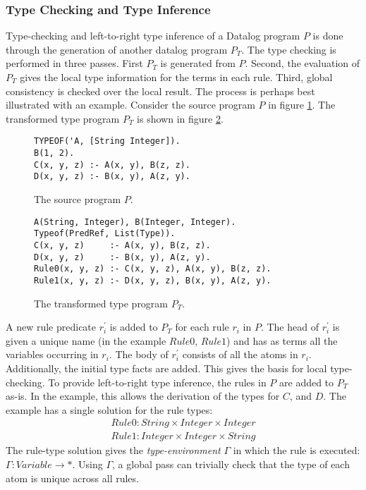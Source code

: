 \subsubsection{Type Checking and Type Inference}
Type-checking and left-to-right type inference of a Datalog program $P$ is done through the generation of another datalog program $P_T$. The type checking is performed in three passes. First $P_T$ is generated from $P$. Second, the evaluation of $P_T$ gives the local type information for the terms in each rule. Third, global consistency is checked over the local result. The process is perhaps best illustrated with an example. Consider the source program $P$ in figure \ref{figure:sourceP}. The transformed type program $P_T$ is shown in figure \ref{figure:sourcePT}.
\begin{figure}[!ht]
\begin{verbatim}
TYPEOF('A, [String Integer]).
B(1, 2).
C(x, y, z) :- A(x, y), B(z, z).
D(x, y, z) :- B(x, y), A(z, y).
\end{verbatim}
\caption{The source program $P$.}
\label{figure:sourceP}
\end{figure}

\begin{figure}[!ht]
\begin{verbatim}
A(String, Integer), B(Integer, Integer).
Typeof(PredRef, List(Type)).
C(x, y, z)     :- A(x, y), B(z, z).
D(x, y, z)     :- B(x, y), A(z, y).
Rule0(x, y, z) :- C(x, y, z), A(x, y), B(z, z).
Rule1(x, y, z) :- D(x, y, z), B(x, y), A(z, y).
\end{verbatim}
\caption{The transformed type program $P_T$.}
\label{figure:sourcePT}
\end{figure}
\noindent
A new rule predicate $r^{'}_i$ is added to $P_T$ for each rule $r_i$ in $P$. The head of $r^{'}_i$ is given a unique name (in the example $Rule0$, $Rule1$) and has as terms all the variables occurring in $r_i$. The body of $r^{'}_i$ consists of all the atoms in $r_i$. Additionally, the initial type facts are added. This gives the basis for local type-checking. To provide left-to-right type inference, the rules in $P$ are added to $P_T$ as-is. In the example, this allows the derivation of the types for $C$, and $D$. 
The example has a single solution for the rule types:
\begin{align*}
Rule0 : String  \times Integer \times Integer\\
Rule1 : Integer \times Integer \times String
\end{align*}
The rule-type solution gives the \textit{type-environment} $\Gamma$ in which the rule is executed: $\Gamma : Variable \rightarrow *$. Using $\Gamma$, a global pass can trivially check that the type of each atom is unique across all rules.

